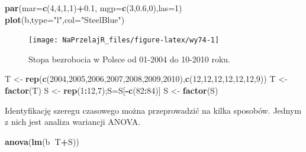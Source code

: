\documentclass[polish,]{book}
\newenvironment{Shaded}{\begin{snugshade}}{\end{snugshade}}
\newcommand{\DataTypeTok}[1]{\textcolor[rgb]{0.13,0.29,0.53}{#1}}
\newcommand{\DecValTok}[1]{\textcolor[rgb]{0.00,0.00,0.81}{#1}}
\newcommand{\FloatTok}[1]{\textcolor[rgb]{0.00,0.00,0.81}{#1}}
\newcommand{\KeywordTok}[1]{\textcolor[rgb]{0.13,0.29,0.53}{\textbf{#1}}}
\newcommand{\NormalTok}[1]{#1}
\newcommand{\OperatorTok}[1]{\textcolor[rgb]{0.81,0.36,0.00}{\textbf{#1}}}
\newcommand{\StringTok}[1]{\textcolor[rgb]{0.31,0.60,0.02}{#1}}
\begin{document}
\begin{Shaded}
\begin{Highlighting}[]
\KeywordTok{par}\NormalTok{(}\DataTypeTok{mar=}\KeywordTok{c}\NormalTok{(}\DecValTok{4}\NormalTok{,}\DecValTok{4}\NormalTok{,}\DecValTok{1}\NormalTok{,}\DecValTok{1}\NormalTok{)}\OperatorTok{+}\FloatTok{0.1}\NormalTok{, }\DataTypeTok{mgp=}\KeywordTok{c}\NormalTok{(}\DecValTok{3}\NormalTok{,}\FloatTok{0.6}\NormalTok{,}\DecValTok{0}\NormalTok{),}\DataTypeTok{las=}\DecValTok{1}\NormalTok{)}
\KeywordTok{plot}\NormalTok{(b,}\DataTypeTok{type=}\StringTok{"l"}\NormalTok{,}\DataTypeTok{col=}\StringTok{"SteelBlue"}\NormalTok{)}
\end{Highlighting}
\end{Shaded}

\begin{figure}[h]

{\centering \texttt{[image: NaPrzelajR\_files/figure-latex/wy74-1]} 

}

\caption{Stopa bezrobocia w Polsce od 01-2004 do 10-2010 roku.}\label{fig:wy74}
\end{figure}

\begin{Shaded}
\begin{Highlighting}[]
\NormalTok{T <-}\StringTok{ }\KeywordTok{rep}\NormalTok{(}\KeywordTok{c}\NormalTok{(}\DecValTok{2004}\NormalTok{,}\DecValTok{2005}\NormalTok{,}\DecValTok{2006}\NormalTok{,}\DecValTok{2007}\NormalTok{,}\DecValTok{2008}\NormalTok{,}\DecValTok{2009}\NormalTok{,}\DecValTok{2010}\NormalTok{),}\KeywordTok{c}\NormalTok{(}\DecValTok{12}\NormalTok{,}\DecValTok{12}\NormalTok{,}\DecValTok{12}\NormalTok{,}\DecValTok{12}\NormalTok{,}\DecValTok{12}\NormalTok{,}\DecValTok{12}\NormalTok{,}\DecValTok{9}\NormalTok{))}
\NormalTok{T <-}\StringTok{ }\KeywordTok{factor}\NormalTok{(T)}
\NormalTok{S <-}\StringTok{ }\KeywordTok{rep}\NormalTok{(}\DecValTok{1}\OperatorTok{:}\DecValTok{12}\NormalTok{,}\DecValTok{7}\NormalTok{);S=S[}\OperatorTok{-}\KeywordTok{c}\NormalTok{(}\DecValTok{82}\OperatorTok{:}\DecValTok{84}\NormalTok{)]}
\NormalTok{S <-}\StringTok{ }\KeywordTok{factor}\NormalTok{(S)}
\end{Highlighting}
\end{Shaded}

Identyfikację szeregu czasowego można przeprowadzić na kilka sposobów. Jednym z
nich jest analiza wariancji ANOVA.

\begin{Shaded}
\begin{Highlighting}[]
\KeywordTok{anova}\NormalTok{(}\KeywordTok{lm}\NormalTok{(b}\OperatorTok{~}\NormalTok{T}\OperatorTok{+}\NormalTok{S))}
\end{Highlighting}
\end{Shaded}
\end{document}
